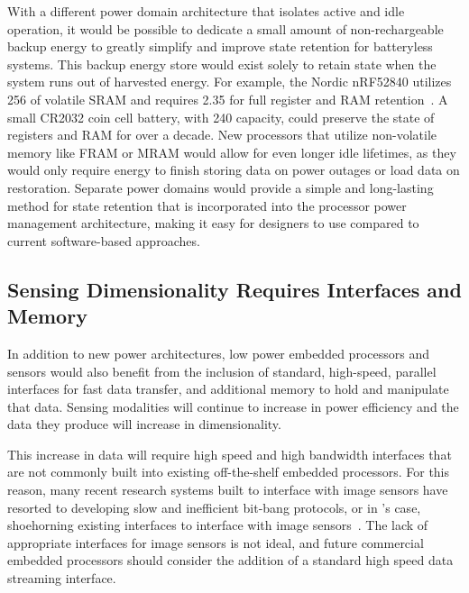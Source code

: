 With a different power domain architecture that isolates active and idle operation, it would be possible to dedicate a small amount of non-rechargeable backup energy to greatly simplify and improve state retention for batteryless systems.
This backup energy store would exist solely to retain state when the system runs out of harvested energy.
For example, the Nordic nRF52840 utilizes 256\ssi{\kilo\byte} of volatile SRAM and requires 2.35\ssi{\micro\watt} for full register and RAM retention~\cite{nrf52840}. 
A small CR2032 coin cell battery, with 240\ssi{\milli\Ah} capacity, could preserve the state of registers and RAM for over a decade.
New processors that utilize non-volatile memory like FRAM or MRAM would allow for even longer idle lifetimes, as they would only require energy to finish storing data on power outages or load data on restoration. 
Separate power domains would provide a simple and long-lasting method for state retention that is incorporated into the processor power management architecture, making it easy for designers to use compared to current software-based approaches. 

\subsection{Sensing Dimensionality Requires Interfaces and Memory}
In addition to new power architectures, low power embedded processors and sensors would also benefit from the inclusion of standard, high-speed, parallel interfaces for fast data transfer, and additional memory to hold and manipulate that data.
Sensing modalities will continue to increase in power efficiency and the data they produce will increase in dimensionality.

This increase in data will require high speed and high bandwidth interfaces that are not commonly built into existing off-the-shelf embedded processors.
For this reason, many recent research systems built to interface with image sensors have resorted to developing slow and inefficient bit-bang protocols, or in \namec{}'s case, shoehorning existing interfaces to interface with image sensors~\cite{josephson2019wireless, desai2022camaroptera}. 
The lack of appropriate interfaces for image sensors is not ideal, and future commercial embedded processors should consider the addition of a standard high speed data streaming interface. 

